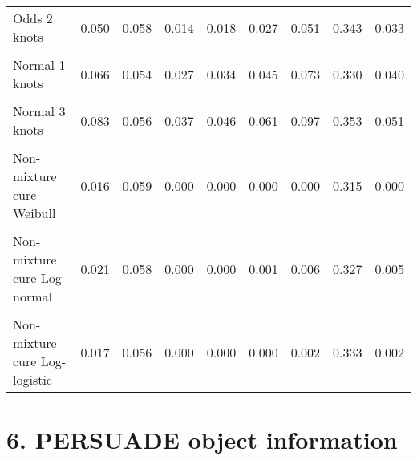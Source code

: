 \documentclass[
]{article}
\begin{document}
\begin{table}[H]
{\begin{tabular}[t]{lrrrrrrrr}
Odds 2 knots & 0.050 & 0.058 & 0.014 & 0.018 & 0.027 & 0.051 & 0.343 & 0.033\\
\cellcolor{gray!10}{Odds 3 knots} & \cellcolor{gray!10}{0.056} & \cellcolor{gray!10}{0.060} & \cellcolor{gray!10}{0.016} & \cellcolor{gray!10}{0.021} & \cellcolor{gray!10}{0.031} & \cellcolor{gray!10}{0.060} & \cellcolor{gray!10}{0.363} & \cellcolor{gray!10}{0.039}\\
Normal 1 knots & 0.066 & 0.054 & 0.027 & 0.034 & 0.045 & 0.073 & 0.330 & 0.040\\
\cellcolor{gray!10}{Normal 2 knots} & \cellcolor{gray!10}{0.067} & \cellcolor{gray!10}{0.054} & \cellcolor{gray!10}{0.028} & \cellcolor{gray!10}{0.035} & \cellcolor{gray!10}{0.047} & \cellcolor{gray!10}{0.075} & \cellcolor{gray!10}{0.327} & \cellcolor{gray!10}{0.040}\\
Normal 3 knots & 0.083 & 0.056 & 0.037 & 0.046 & 0.061 & 0.097 & 0.353 & 0.051\\
\cellcolor{gray!10}{Mixture cure Weibull} & \cellcolor{gray!10}{0.015} & \cellcolor{gray!10}{0.058} & \cellcolor{gray!10}{0.000} & \cellcolor{gray!10}{0.000} & \cellcolor{gray!10}{0.000} & \cellcolor{gray!10}{0.000} & \cellcolor{gray!10}{0.310} & \cellcolor{gray!10}{0.000}\\
Non-mixture cure Weibull & 0.016 & 0.059 & 0.000 & 0.000 & 0.000 & 0.000 & 0.315 & 0.000\\
\cellcolor{gray!10}{Mixture cure Log-normal} & \cellcolor{gray!10}{0.020} & \cellcolor{gray!10}{0.060} & \cellcolor{gray!10}{0.000} & \cellcolor{gray!10}{0.000} & \cellcolor{gray!10}{0.000} & \cellcolor{gray!10}{0.002} & \cellcolor{gray!10}{0.318} & \cellcolor{gray!10}{0.002}\\
Non-mixture cure Log-normal & 0.021 & 0.058 & 0.000 & 0.000 & 0.001 & 0.006 & 0.327 & 0.005\\
\cellcolor{gray!10}{Mixture cure Log-logistic} & \cellcolor{gray!10}{0.018} & \cellcolor{gray!10}{0.057} & \cellcolor{gray!10}{0.000} & \cellcolor{gray!10}{0.000} & \cellcolor{gray!10}{0.000} & \cellcolor{gray!10}{0.002} & \cellcolor{gray!10}{0.332} & \cellcolor{gray!10}{0.002}\\
Non-mixture cure Log-logistic & 0.017 & 0.056 & 0.000 & 0.000 & 0.000 & 0.002 & 0.333 & 0.002\\
\bottomrule
\end{tabular}}
\end{table}

\clearpage

\section{6. PERSUADE object
information}\label{persuade-object-information}
\end{document}
